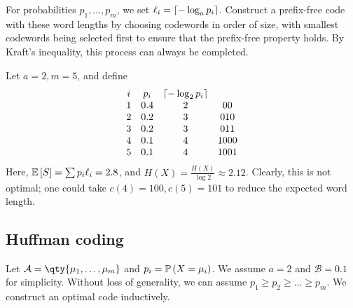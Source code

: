 \begin{example}
    For probabilities $p_1, \dots, p_m$, we set $\ell_i = \lceil-\log_a p_i\rceil$.
    Construct a prefix-free code with these word lengths by choosing codewords in order of size, with smallest codewords being selected first to ensure that the prefix-free property holds.
    By Kraft's inequality, this process can always be completed.
\end{example}
\begin{example}
    Let $a = 2, m = 5$, and define
    \[ \begin{array}{cccc}
            i & p_i & \lceil-\log_2 p_i\rceil \\
            1 & 0.4 & 2 & 00 \\
            2 & 0.2 & 3 & 010 \\
            3 & 0.2 & 3 & 011 \\
            4 & 0.1 & 4 & 1000 \\
            5 & 0.1 & 4 & 1001
    \end{array} \]
    Here, $\mathbb{E}\left[{S}\right] = \sum p_i \ell_i = 2.8$, and $H(X) = \frac{H(X)}{\log 2} \approx 2.12$.
    Clearly, this is not optimal; one could take $c(4) = 100, c(5) = 101$ to reduce the expected word length.
\end{example}

\subsection{Huffman coding}
Let $\mathcal A = \qty{\mu_1, \dots, \mu_m}$ and $p_i = \mathbb{P}\left({X = \mu_i}\right)$.
We assume $a = 2$ and $\mathcal B = \qty{0,1}$ for simplicity.
Without loss of generality, we can assume $p_1 \geq p_2 \geq \dots \geq p_m$.
We construct an optimal code inductively.

